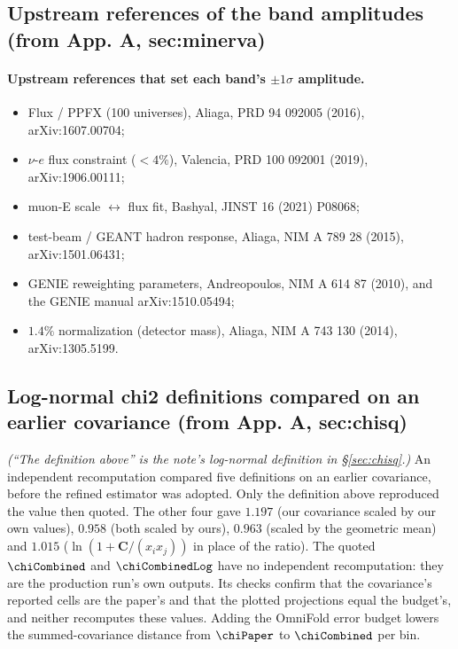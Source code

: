 \subsection{Upstream references of the band amplitudes (from App. A, sec:minerva)}
\paragraph{Upstream references that set each band's $\pm1\sigma$ amplitude.}
\begin{itemize}[nosep]
  \item Flux / PPFX (100 universes), Aliaga, PRD 94 092005 (2016), arXiv:1607.00704;
  \item $\nu$-$e$ flux constraint ($<4\%$), Valencia, PRD 100 092001 (2019), arXiv:1906.00111;
  \item muon-E scale $\leftrightarrow$ flux fit, Bashyal, JINST 16 (2021) P08068;
  \item test-beam / GEANT hadron response, Aliaga, NIM A 789 28 (2015), arXiv:1501.06431;
  \item GENIE reweighting parameters, Andreopoulos, NIM A 614 87 (2010), and the GENIE manual arXiv:1510.05494;
  \item $1.4\%$ normalization (detector mass), Aliaga, NIM A 743 130 (2014), arXiv:1305.5199.
\end{itemize}

\subsection{Log-normal chi2 definitions compared on an earlier covariance (from App. A, sec:chisq)}
\noindent\emph{(``The definition above'' is the note's log-normal definition in \S\ref{sec:chisq}.)}
 An independent recomputation compared five definitions on an earlier covariance, before the refined estimator was adopted. Only the definition above reproduced the value then quoted. The other four gave $1.197$ (our covariance scaled by our own values), $0.958$ (both scaled by ours), $0.963$ (scaled by the geometric mean) and $1.015$ ($\ln(1+\mathbf{C}/(x_{i}x_{j}))$ in place of the ratio). The quoted $\chiCombined$ and $\chiCombinedLog$ have no independent recomputation: they are the production run's own outputs. Its checks confirm that the covariance's reported cells are the paper's and that the plotted projections equal the budget's, and neither recomputes these values. Adding the OmniFold error budget lowers the summed-covariance distance from $\chiPaper$ to $\chiCombined$ per bin. %

